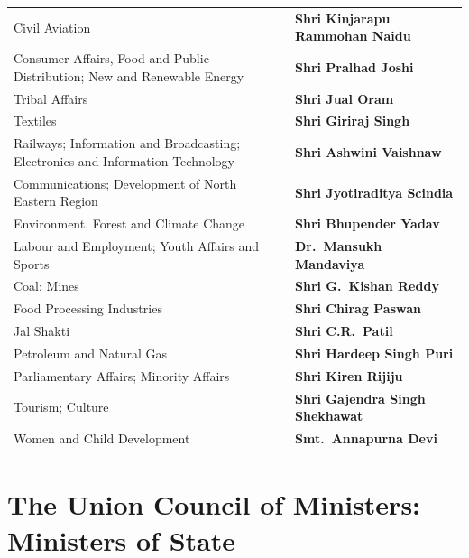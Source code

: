 \documentclass[12pt,a4paper,openany]{report}
\begin{document}
{\begin{longtable}{@{}>{\raggedright\arraybackslash}p{8.3cm} >{\raggedright\arraybackslash}p{7.1cm}@{}}
\addlinespace[2pt]
Civil Aviation & \textbf{Shri Kinjarapu Rammohan Naidu} \\
\addlinespace[2pt]
Consumer Affairs, Food and Public Distribution; New and Renewable Energy & \textbf{Shri Pralhad Joshi} \\
\addlinespace[2pt]
Tribal Affairs & \textbf{Shri Jual Oram} \\
\addlinespace[2pt]
Textiles & \textbf{Shri Giriraj Singh} \\
\addlinespace[2pt]
Railways; Information and Broadcasting; Electronics and Information Technology & \textbf{Shri Ashwini Vaishnaw} \\
\addlinespace[2pt]
Communications; Development of North Eastern Region & \textbf{Shri Jyotiraditya Scindia} \\
\addlinespace[2pt]
Environment, Forest and Climate Change & \textbf{Shri Bhupender Yadav} \\
\addlinespace[2pt]
Labour and Employment; Youth Affairs and Sports & \textbf{Dr.\ Mansukh Mandaviya} \\
\addlinespace[2pt]
Coal; Mines & \textbf{Shri G.\ Kishan Reddy} \\
\addlinespace[2pt]
Food Processing Industries & \textbf{Shri Chirag Paswan} \\
\addlinespace[2pt]
Jal Shakti & \textbf{Shri C.R.\ Patil} \\
\addlinespace[2pt]
Petroleum and Natural Gas & \textbf{Shri Hardeep Singh Puri} \\
\addlinespace[2pt]
Parliamentary Affairs; Minority Affairs & \textbf{Shri Kiren Rijiju} \\
\addlinespace[2pt]
Tourism; Culture & \textbf{Shri Gajendra Singh Shekhawat} \\
\addlinespace[2pt]
Women and Child Development & \textbf{Smt.\ Annapurna Devi} \\
\bottomrule
\end{longtable}}

\newpage
\section*{The Union Council of Ministers: Ministers of State}


\vspace{4pt}
\end{document}
